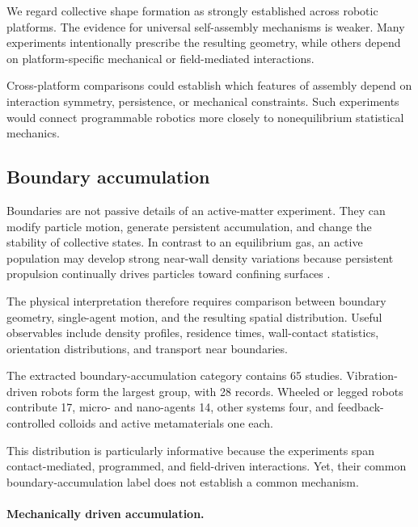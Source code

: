We regard collective
shape formation as
strongly established
across robotic platforms.
The evidence for
universal self-assembly
mechanisms is weaker.
Many experiments
intentionally prescribe
the resulting geometry,
while others depend
on platform-specific
mechanical or
field-mediated
interactions.



Cross-platform
comparisons could
establish which
features of assembly
depend on interaction
symmetry, persistence,
or mechanical constraints.
Such experiments
would connect
programmable robotics
more closely to
nonequilibrium
statistical mechanics.

\subsection{Boundary accumulation}
\label{sec:phenomena-boundaries}

Boundaries are not passive details of an active-matter
experiment. They can modify particle motion,
generate persistent accumulation, and change
the stability of collective states.
In contrast to an equilibrium gas,
an active population may develop
strong near-wall density variations
because persistent propulsion
continually drives particles
toward confining surfaces
\cite{Bechinger2016active}.



The physical interpretation
therefore requires comparison
between boundary geometry,
single-agent motion,
and the resulting
spatial distribution.
Useful observables include
density profiles,
residence times,
wall-contact statistics,
orientation distributions,
and transport
near boundaries.

The extracted boundary-accumulation
category contains 65 studies.
Vibration-driven robots
form the largest group,
with 28 records.
Wheeled or legged
robots contribute 17,
micro- and nano-agents 14,
other systems four,
and feedback-controlled
colloids and active
metamaterials one each.

This distribution is
particularly informative
because the experiments
span contact-mediated,
programmed, and
field-driven interactions.
Yet, their common
boundary-accumulation label
does not establish
a common mechanism.

\paragraph*{Mechanically driven accumulation.}

